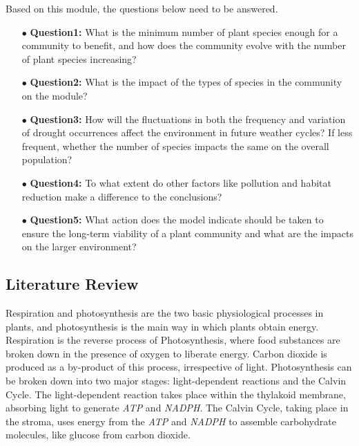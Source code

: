 \documentclass[12pt]{article}  %
\begin{document}
Based on this module, the questions below need to be answered.

\begin{itemize}
\vspace{-0.4cm}
\item[$\bullet$] \textbf{Question1: }What is the minimum number of plant species enough for a community to benefit, and how does the community evolve with the number of plant species increasing?
\vspace{-0.1cm}
\item[$\bullet$] \textbf{Question2: }What is the impact of the types of species in the community on the module? 
\vspace{-0.1cm}
\item[$\bullet$] \textbf{Question3: }How will the fluctuations in both the frequency and variation of drought occurrences affect the environment in future weather cycles? If less frequent, whether the number of species impacts the same on the overall population? 
\vspace{-0.1cm}
\item[$\bullet$] \textbf{Question4: }To what extent do other factors like pollution and habitat reduction make a difference to the conclusions?
\vspace{-0.1cm}
\item[$\bullet$] \textbf{Question5: }What action does the model indicate should be taken to ensure the long-term viability of a plant community and what are the impacts on the larger environment? 
\end{itemize}


\vspace{-0.5cm}
\subsection{Literature Review}
\vspace{-0.3cm}

Respiration and photosynthesis are the two basic physiological processes in plants, and photosynthesis is the main way in which plants obtain energy. Respiration is the reverse process of Photosynthesis{\cite{2}}, where food substances are broken down in the presence of oxygen to liberate energy. Carbon dioxide is produced as a by-product of this process, irrespective of light. Photosynthesis can be broken down into two major stages: light-dependent reactions and the Calvin Cycle{\cite{3}}. The light-dependent reaction takes place within the thylakoid membrane, absorbing light to generate \textit{ATP} and \textit{NADPH}. The Calvin Cycle, taking place in the stroma, uses energy from the \textit{ATP} and \textit{NADPH} to assemble carbohydrate molecules, like glucose from carbon dioxide. 
\end{document}
